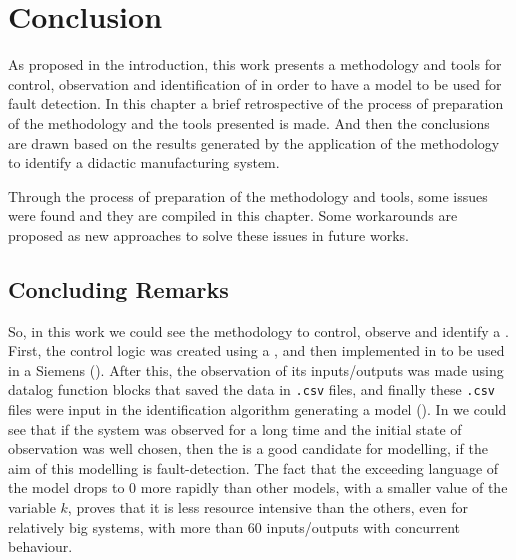 \chapter{Conclusion}
\label{cha:conclusion}
As proposed in the introduction, this work presents a methodology and tools for
control, observation and identification of \DESs{} in order to have a model to be
used for fault detection. In this chapter a brief retrospective of the process
of preparation of the methodology and the tools presented is made. And then the
conclusions are drawn based on the results generated by the application of
the methodology
to identify a didactic manufacturing system.

Through the process of preparation of the methodology and tools, some issues
were found and they are compiled in this chapter. Some
workarounds are proposed as new approaches to solve these issues in future works.

\section{Concluding Remarks}
\label{sec:concludingRemarks}
So, in this work we could see the methodology to control, observe and identify a
\DES{}. First, the control logic was created using a \CIPN, and then implemented
in \LD{} to be used in a Siemens \PLC{} (). After this, the observation of its
inputs\slash outputs was made using datalog function blocks that saved the data in
\verb|.csv| files, and finally these \verb|.csv| files were input in the
identification algorithm generating a \DAOCT{} model (). In
 we could see that if the system was observed for a long
time and the initial state of observation was well chosen, then the \DAOCT{} is
a good candidate for modelling, if the aim of this modelling is fault-detection.
The fact that the exceeding language of the \DAOCT{} model drops to $0$ more
rapidly than other models, with a smaller value of the variable $k$, proves that it is less resource intensive than the
others, even for relatively big
systems, with more than $60$ inputs\slash outputs with concurrent behaviour.


